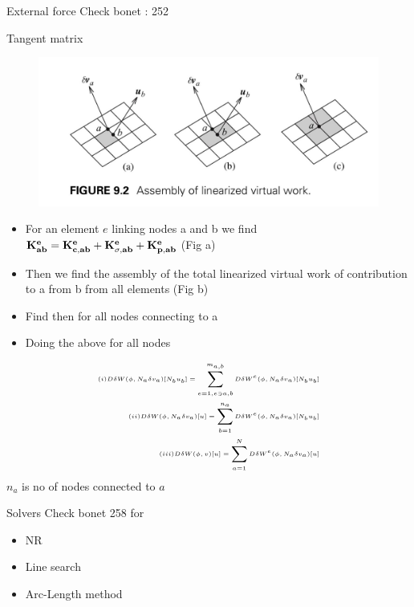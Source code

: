  
 	\begin{frame}{External force}
 		Check bonet : 252
 	\end{frame}
 
 
 	\begin{frame}{Tangent matrix}
		\begin{figure}
 			\centering
 			\includegraphics[width=0.5\linewidth]{Figure/fig14} 
 		\end{figure}
	 	\begin{itemize}
			\item For an element $e$ linking nodes a and b we find $\mathbf{K_{ab}^e = K_{c,ab}^e + K_{\sigma,ab}^e + K_{p,ab}^e}$  (Fig a)
	 		\item Then we find the assembly of the total linearized virtual work of contribution to a from b from all elements (Fig b)
	 		\item Find then for all nodes connecting to a
	 		\item Doing the above for all nodes
	 	\end{itemize}
 	
 	\begin{equation}
 	\tiny
 		\begin{aligned}
 		(i) D\delta W(\phi,N_a\delta v_a)[N_bu_b] = \sum_{e=1,e \ni a,b}^{m_{a,b}} D\delta W^e(\phi,N_a \delta v_a)[N_b u_b]\\
 		(ii)  D\delta W(\phi,N_a\delta v_a)[u] = \sum_{b=1}^{n_a} D\delta W^e(\phi,N_a \delta v_a)[N_b u_b]\\
 		(iii)  D\delta W(\phi,v)[u] = \sum_{a=1}^{N} D\delta W^e(\phi,N_a \delta v_a)[u]\\
 		\end{aligned}
 	\end{equation}
 	$n_a$ is no of nodes connected to $a$
 	\end{frame}
 
 	
 	\begin{frame}{Solvers}
 		Check bonet 258 for 
 		\begin{itemize}
 			\item NR
 			\item Line search
 			\item Arc-Length method 			
 		\end{itemize}
 	\end{frame}
 
